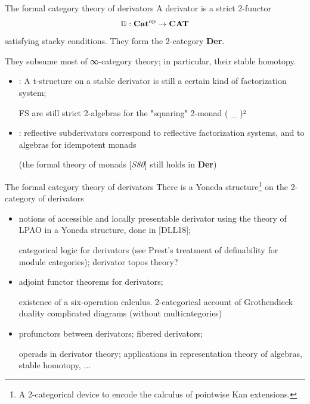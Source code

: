 \documentclass[handout]{beamer}
\def\lnk#1{\href{#1}{\faFilePdfO}}
\begin{document}
\begin{frame}{The formal category theory of derivators}
  A \alert{derivator} is a strict 2-functor
  \[\mathbb{D} : {\bf Cat}^\text{op} \to {\bf CAT} \]
  satisfying stacky conditions. They form the 2-category \textbf{Der}.

  They subsume most of ∞-category theory; in particular, their stable homotopy.
  \begin{itemize}
    \item<2-> [{[\alert{LV17}\lnk{https://www.sciencedirect.com/science/article/abs/pii/S0021869320300296}]}] : A t-structure on a stable derivator is still a certain kind of factorization system;

    {\footnotesize\color{gray!40} FS are still \alert{strict 2-algebras} for the "squaring" 2-monad ( \_ )²}%

    \item<3->  [{[\alert{Lor18}\lnk{https://arxiv.org/abs/1802.08193}]}] : reflective subderivators correspond to reflective factorization systems, and to algebras for idempotent monads

    {\footnotesize\color{gray!40} (the \alert{formal theory of monads} [\emph{S80}] still holds in \textbf{Der})}%
  \end{itemize}
\end{frame}
%
\begin{frame}{The formal category theory of derivators}
  There is a \alert{Yoneda structure}\footnote{A 2-categorical device to encode the calculus of pointwise Kan extensions.} on the 2-category of derivators
\begin{itemize}
\item<2-> notions of \alert{accessible} and \alert{locally presentable} derivator using the theory of LPAO in a Yoneda structure, done in [\alert{DLL18}\lnk{https://arxiv.org/abs/1804.08710}];

{\footnotesize\color{gray!60} categorical logic for derivators (see Prest's treatment of \alert{definability} for module categories); derivator \alert{topos theory}?}
\item<3-> \alert{adjoint functor theorem}s for derivators;

{\footnotesize\color{gray!60} existence of a \alert{six-operation} calculus. 2-categorical account of Grothendieck duality complicated diagrams (without multicategories)}
\item<4-> \alert{profunctors} between derivators; fibered derivators;

{\footnotesize\color{gray!60} \alert{operads} in derivator theory; applications in representation theory of algebras, stable homotopy, ...}
\end{itemize}
\end{frame}
\end{document}
